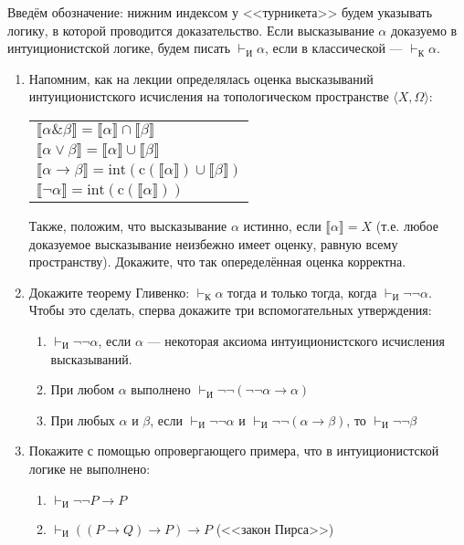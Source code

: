 \documentclass[10pt,a4paper,oneside]{article}
\begin{document}
Введём обозначение: нижним индексом у <<турникета>> будем указывать логику, в которой 
проводится доказательство. Если высказывание $\alpha$ доказуемо в интуиционистской логике,
будем писать $\vdash_\texttt{И}\alpha$, если в классической --- $\vdash_\texttt{К}\alpha$.

\begin{enumerate}

\item Напомним, как на лекции определялась оценка высказываний интуиционистского 
исчисления на топологическом пространстве $\langle X, \Omega \rangle$:

\begin{tabular}{l}\\
$\llbracket \alpha \& \beta \rrbracket = \llbracket \alpha \rrbracket \cap \llbracket \beta \rrbracket$\\
$\llbracket \alpha \vee \beta \rrbracket = \llbracket \alpha \rrbracket \cup \llbracket \beta \rrbracket$\\
$\llbracket \alpha \rightarrow \beta \rrbracket = \mathrm{int}(\mathrm{c}(\llbracket \alpha \rrbracket) \cup \llbracket \beta \rrbracket)$\\
$\llbracket \neg \alpha \rrbracket = \mathrm{int}(\mathrm{c}(\llbracket \alpha \rrbracket))$
\end{tabular}

Также, положим, что высказывание $\alpha$ истинно, если $\llbracket\alpha\rrbracket = X$
(т.е. любое доказуемое высказывание неизбежно имеет оценку, равную всему пространству).
Докажите, что так опеределённая оценка корректна.

\item Докажите теорему Гливенко: $\vdash_\texttt{К}\alpha$ тогда и только тогда, когда
$\vdash_\texttt{И}\neg\neg\alpha$. Чтобы это сделать, сперва докажите три вспомогательных
утверждения:
\begin{enumerate}
\item $\vdash_\texttt{И}\neg\neg\alpha$, если $\alpha$ --- некоторая аксиома интуиционистского
исчисления высказываний.
\item При любом $\alpha$ выполнено $\vdash_\texttt{И}\neg\neg(\neg\neg\alpha \rightarrow \alpha)$
\item При любых $\alpha$ и $\beta$, если $\vdash_\texttt{И}\neg\neg\alpha$ и
$\vdash_\texttt{И}\neg\neg(\alpha\rightarrow\beta)$, то $\vdash_\texttt{И}\neg\neg\beta$
\end{enumerate}

\item Покажите с помощью опровергающего примера, что в интуиционистской логике не выполнено:
\begin{enumerate}
\item $\vdash_\texttt{И}\neg\neg P\rightarrow P$
\item $\vdash_\texttt{И}((P\rightarrow Q)\rightarrow P)\rightarrow P$
 (<<закон Пирса>>)
\end{enumerate}


\end{enumerate}
\end{document}
